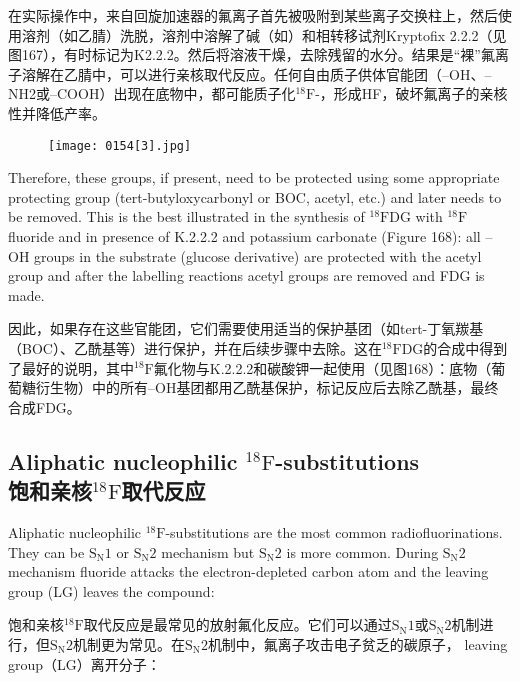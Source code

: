 \documentclass[dvipsnames, svgnames,a4paper,11pt]{article}
\begin{document}
在实际操作中，来自回旋加速器的氟离子首先被吸附到某些离子交换柱上，然后使用溶剂（如乙腈）洗脱，溶剂中溶解了碱（如）和相转移试剂Kryptofix 2.2.2（见图167），有时标记为K2.2.2。然后将溶液干燥，去除残留的水分。结果是“裸”氟离子溶解在乙腈中，可以进行亲核取代反应。任何自由质子供体官能团（–OH、–NH2或–COOH）出现在底物中，都可能质子化${}^\mathrm{18}\mathrm{F}$-，形成HF，破坏氟离子的亲核性并降低产率。

\begin{figure}[h]
	\centering
    \texttt{[image: 0154[3].jpg]}    
     \label{fig168}
\end{figure}

Therefore, these groups, if present, need to be protected using some appropriate
protecting group (tert-butyloxycarbonyl or BOC, acetyl, etc.) and later needs to be
removed. This is the best illustrated in the synthesis of ${}^\mathrm{18}\mathrm{F}$DG with ${}^\mathrm{18}\mathrm{F}$ fluoride and in
presence of K.2.2.2 and potassium carbonate (Figure 168): all –OH groups in the
substrate (glucose derivative) are protected with the acetyl group and after the
labelling reactions acetyl groups are removed and FDG is made.

因此，如果存在这些官能团，它们需要使用适当的保护基团（如tert-丁氧羰基（BOC）、乙酰基等）进行保护，并在后续步骤中去除。这在${}^\mathrm{18}\mathrm{F}$DG的合成中得到了最好的说明，其中${}^\mathrm{18}\mathrm{F}$氟化物与K.2.2.2和碳酸钾一起使用（见图168）：底物（葡萄糖衍生物）中的所有–OH基团都用乙酰基保护，标记反应后去除乙酰基，最终合成FDG。

\subsection{Aliphatic nucleophilic ${}^\mathrm{18}\mathrm{F}$-substitutions \\饱和亲核${}^\mathrm{18}\mathrm{F}$取代反应}

Aliphatic nucleophilic ${}^\mathrm{18}\mathrm{F}$-substitutions are the most common radiofluorinations. They
can be $\mathrm{S_N1}$ or $\mathrm{S_N2}$ mechanism but $\mathrm{S_N2}$ is more common. During $\mathrm{S_N2}$ mechanism
fluoride attacks the electron-depleted carbon atom and the leaving group (LG) leaves
the compound:

饱和亲核${}^\mathrm{18}\mathrm{F}$取代反应是最常见的放射氟化反应。它们可以通过$\mathrm{S_N1}$或$\mathrm{S_N2}$机制进行，但$\mathrm{S_N2}$机制更为常见。在$\mathrm{S_N2}$机制中，氟离子攻击电子贫乏的碳原子， leaving group（LG）离开分子：
\end{document}
